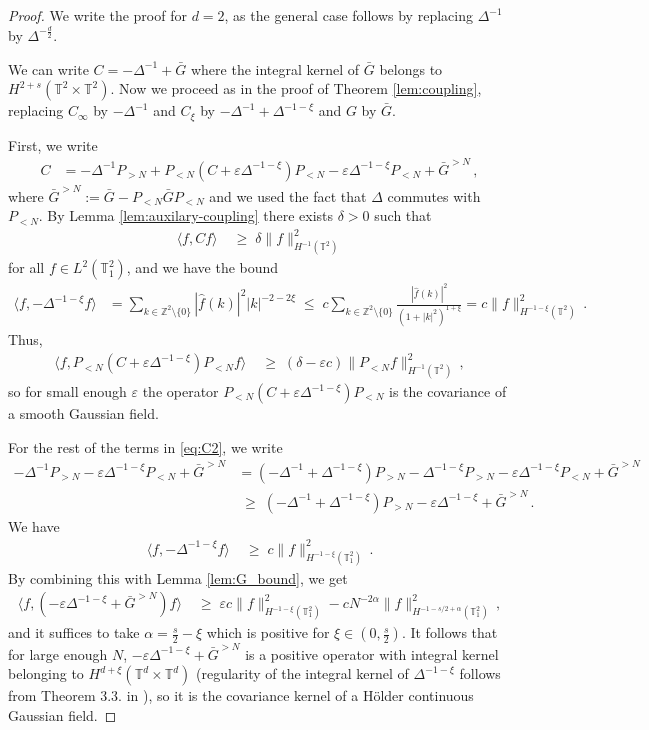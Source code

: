\documentclass[11pt]{article}
\numberwithin{equation}{section}
\theoremstyle{definition}
\renewcommand{\leq}{\;\leqslant\;}                   %
\renewcommand{\geq}{\;\geqslant\;}                   %
\newcommand{\Z}{\mathbb{Z}}
\def\eps{\varepsilon}
\def\T{\mathbb{T}}
\newcommand{\tor}{{\T_1^2}}
\newcommand{\PN}{ {P_{< N}} }
\newcommand{\PNN}{ {P_{>N}} }
\begin{document}
\begin{proof}
We write the proof for $d=2$, as the general case follows by replacing $\Delta^{-1}$  by $\Delta^{-\frac{d}{2}}$.

 We can write $C= - \Delta^{-1} + \bar G$ where the integral kernel of $\bar G$ belongs to $H^{2+s}(\T^2 \times \T^2)$. Now we proceed as in the proof of Theorem \ref{lem:coupling}, replacing $C_\infty$ by $- \Delta^{-1}$ and $C_\xi$ by $-\Delta^{-1}+\Delta^{-1-\xi}$ and $G$ by $\bar{G}$.
 
First, we write
 \begin{align}\label{eq:C2}
 C &= - \Delta^{-1} \PNN + \PN (C + \eps \Delta^{-1-\xi}) \PN - \eps \Delta^{-1-\xi} \PN + \bar G^{>N}\,,
 \end{align}
 where $\bar G^{>N} := \bar G - \PN \bar G \PN$ and we used the fact that $\Delta$ commutes with $\PN$. By Lemma \ref{lem:auxilary-coupling} there exists $\delta > 0$ such that 
 \begin{align*}
 \langle f,  C f \rangle & \geq \delta \|f\|_{H^{-1}(\T^2)}^2 
 \end{align*}
 for all $f \in L^2(\tor)$, and we have the bound
\begin{align}\label{eq:Delta_xi_bound}
\langle f,  - \Delta^{-1-\xi} f \rangle &= \sum_{k \in \Z^2 \setminus \{0\}} |\hat f(k)|^2 |k|^{-2-2\xi}  \leq c \sum_{k \in \Z^2 \setminus \{0\}} \frac{|\hat f(k)|^2}{(1+|k|^2)^{1+\xi}} = c\|f\|_{H^{-1-\xi}(\T^2)}^2\,.
\end{align}
Thus,
\begin{align*}
\langle f, \PN (C+ \eps \Delta^{-1-\xi}) \PN f \rangle & \geq (\delta - \eps c) \|\PN f\|_{H^{-1}(\T^2)}^2\,,
\end{align*}
so for small enough $\eps$ the operator $\PN (C+ \eps \Delta^{-1-\xi}) \PN$ is the covariance of a smooth Gaussian field.

For the rest of the terms in \eqref{eq:C2}, we write
\begin{align*}
- \Delta^{-1} \PNN - \eps \Delta^{-1-\xi} \PN + \bar G^{>N} &= (- \Delta^{-1} + \Delta^{-1-\xi}) \PNN  - \Delta^{-1-\xi} \PNN - \eps \Delta^{-1-\xi} \PN + \bar G^{>N} \\
& \geq (- \Delta^{-1} + \Delta^{-1-\xi}) \PNN  - \eps \Delta^{-1-\xi} + \bar G^{>N}\,.
\end{align*}
We have
\begin{align*}
\langle f, - \Delta^{-1-\xi} f \rangle &\geq c \|f\|_{H^{-1-\xi}(\tor)}^2\,.
\end{align*}
By combining this with Lemma \ref{lem:G_bound}, we get
\begin{align*}
\langle f, (- \eps \Delta^{-1-\xi} + \bar G^{>N}) f \rangle & \geq \eps c \|f\|_{H^{-1-\xi}(\tor)}^2 - c N^{-2 \alpha} \|f\|_{H^{-1-s/2+\alpha}(\tor)}^2\,,
\end{align*}
and it suffices to take $\alpha = \frac{s}{2} - \xi$ which is positive for $\xi \in (0,\frac{s}{2})$. It follows that for large enough $N$, $- \eps \Delta^{-1-\xi} + \bar G^{>N}$ is a positive operator with integral kernel belonging to $H^{d+\xi}(\T^d \times \T^d)$ (regularity of the integral kernel of $\Delta^{-1-\xi}$ follows from Theorem 3.3. in \cite{LSSW}), so it is the covariance kernel of a Hölder continuous Gaussian field.


\end{proof}
\end{document}
